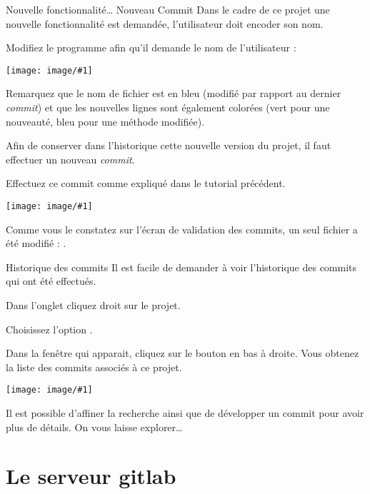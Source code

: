 \documentclass[a4paper,11pt]{style-esi/td}
\newcommand{\image}[2]{{\par\centering \texttt{[image: image/\#1]}\par}
}
\begin{document}
\begin{Tutoriel}{Nouvelle fonctionnalité\dots{} Nouveau Commit}
	Dans le cadre de ce projet une nouvelle fonctionnalité est demandée,
	l'utilisateur doit encoder son nom.
	\begin{steps}
	\item 
		Modifiez le programme afin qu'il demande le nom de l'utilisateur :
		\image{NetBeans_Project_03}{5cm}
	\end{steps}
	Remarquez que le nom de fichier est en bleu 
	(modifié par rapport au dernier \emph{commit})
	et que les nouvelles lignes sont également colorées 
	(vert pour une nouveauté, bleu pour une méthode modifiée).

	Afin de conserver dans l'historique cette nouvelle version du projet, 
	il faut effectuer un nouveau \emph{commit}.
	\begin{steps}
	\item 
		Effectuez ce commit comme expliqué dans le tutorial précédent.
		\image{NetBeans_Project_031}{5cm}
	\end{steps}
	Comme vous le constatez sur l'écran de validation des commits, 
	un seul fichier a été modifié : .
\end{Tutoriel}

\begin{Tutoriel}{Historique des commits}
Il est facile de demander à voir l'historique des commits qui ont été effectués.
\begin{steps}
	\item 
		Dans l'onglet  cliquez droit sur le projet.
	\item 
		Choisissez l'option .
	\item 
		Dans la fenêtre qui apparait, cliquez sur le bouton 
		en bas à droite.
		Vous obtenez la liste des commits associés à ce projet.
		\image{Netbeans_History}{4cm}
\end{steps}
Il est possible d'affiner la recherche 
ainsi que de développer un commit pour avoir plus de détails. 
On vous laisse explorer\dots{}
\end{Tutoriel}

\section{Le serveur gitlab}
\end{document}
